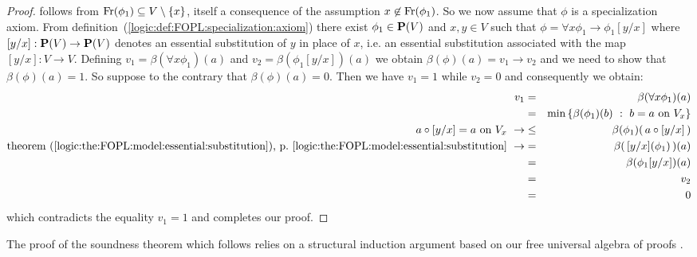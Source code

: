 \begin{proof}
follows from $\mbox{\rm Fr}(\phi_{1})\subseteq V\setminus\{x\}$, itself a
consequence of the assumption $x\not\in\mbox{\rm Fr}(\phi_{1})$. So we now
assume that $\phi$ is a specialization axiom. From
definition~(\ref{logic:def:FOPL:specialization:axiom}) there exist
$\phi_{1}\in\mbox{${\bf P}(V)$}$ and $x,y\in V$ such that $\phi =\forall
x\phi_{1}\to\phi_{1}[y/x]$ where $[y/x]:\mbox{${\bf P}(V)$}\to\mbox{${\bf P}(V)$}$ denotes an
essential substitution of $y$ in place of $x$, i.e. an essential
substitution associated with the map $[y/x]:V\to V$. Defining
$v_{1}=\beta(\forall x\phi_{1})(a)$ and
$v_{2}=\beta(\phi_{1}[y/x])(a)$ we obtain $\beta(\phi)(a)=v_{1}\to
v_{2}$ and we need to show that $\beta(\phi)(a)=1$. So suppose to
the contrary that $\beta(\phi)(a)=0$. Then we have $v_{1}=1$ while
$v_{2}=0$ and consequently we obtain:
    \begin{eqnarray*}
    v_{1}&=&\beta(\forall x\phi_{1})(a)\\
    &=&\min\left\{\beta(\phi_{1})(b)\ :\ b=a\mbox{\ on\
    }V_{x}\right\}\\
    a\circ[y/x]=a\mbox{\ on\ }V_{x}\ \rightarrow
    &\leq&\beta(\phi_{1})(\,a\circ[y/x]\,)\\
    \mbox{theorem~(\ref{logic:the:FOPL:model:essential:substitution}),
    p.~\pageref{logic:the:FOPL:model:essential:substitution}}
    \ \rightarrow&=&\beta(\,[y/x](\phi_{1})\,)(a)\\
    &=&\beta(\phi_{1}[y/x])(a)\\
    &=&v_{2}\\
    &=&0
    \end{eqnarray*}
which contradicts the equality $v_{1}=1$ and completes our proof.
\end{proof}

The proof of the soundness theorem which follows relies on a
structural induction argument based on our free universal algebra of
proofs \pvs.

